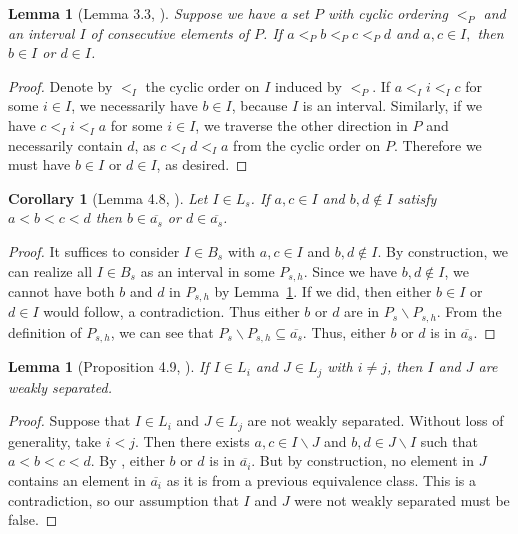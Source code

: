\documentclass[11pt]{amsart}
\theoremstyle{plain}
\newtheorem{lemma}[theorem]{Lemma}
\newtheorem{corollary}[theorem]{Corollary}
\theoremstyle{definition}
\begin{document}
\begin{lemma}[Lemma 3.3, \cite{PasqTZ2019}]\label{lemma: bordinI}
 Suppose we have a set $P$ with  cyclic ordering $<_P$ and an interval $I$ of consecutive elements of $P$. If $a<_Pb<_Pc<_Pd$ and $a,c\in I,$ then $b\in I$ or $d\in I$. 
 \end{lemma}


\begin{proof}
    Denote by $<_I$ the cyclic order on $I$ induced by $<_P$. If $a<_I i <_I c$ for some $i\in I$, we necessarily have $b\in I$, because $I$ is an interval. Similarly, if we have $c<_I i <_I a$ for some $i \in I$, we traverse the other direction in $P$ and necessarily contain $d$, as $c<_Id<_Ia$ from the cyclic order on $P$. Therefore we must have $b\in I$ or $d\in I$, as desired.
\end{proof} 


\begin{corollary}[Lemma 4.8, \cite{PasqTZ2019}]\label{cor:ac-bord}
Let $I\in L_s$. If $a,c\in I$ and $b,d\notin I$ satisfy $a<b<c<d$ then $b\in \overline{a_s}$ or $d\in\overline{a_s}$. \end{corollary} 
\begin{proof}
It suffices to consider $I\in B_s$ with $a, c\in I$ and $b, d\not\in I$. By construction, we can realize all $I\in B_s$ as an interval in some $P_{s,h}$. Since we have $b,d \not \in I$, we cannot have both $b$ and $d$ in $P_{s,h}$ by Lemma~\ref{lemma: bordinI}. If we did, then either $b\in I$ or $d\in I$ would follow, a contradiction. Thus either $b$ or $d$ are in $P_s\backslash P_{s,h}$. From the definition of $P_{s, h}$, we can see that $P_s\backslash P_{s,h}\subseteq \overline {a_s}$. Thus, either $b$ or $d$ is in $\overline{a_s}$. 
\end{proof}
\begin{lemma}[Proposition 4.9, \cite{PasqTZ2019}]\label{lemma:LsLiSep} If $I\in L_i$ and $J\in L_j$ with $i\neq j$, then $I$ and $J$ are weakly separated. 
\end{lemma}
\begin{proof}
    Suppose that $I\in L_i$ and $J\in L_j$ are not weakly separated. Without loss of generality, take $i<j$. Then there exists $a,c\in I\backslash J$ and $b,d\in J\backslash I$ such that $a<b<c<d.$ By , either $b$ or $d$ is in $\overline{a_i}$. But by construction, no element in $J$ contains an element in $\overline{a_i}$ as it is from a previous equivalence class. This is a contradiction, so our assumption that $I$ and $J$ were not weakly separated must be false.
\end{proof}
\end{document}
